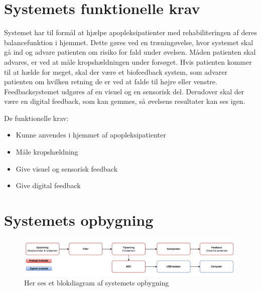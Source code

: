 \section{Systemets funktionelle krav}

Systemet har til formål at hjælpe apopleksipatienter med rehabiliteringen af deres balancefunktion i hjemmet. Dette gøres ved en træningøvelse, hvor systemet skal gå ind og advare patienten om risiko for fald under øvelsen. Måden patienten skal advares, er ved at måle kropshældningen under forsøget. Hvis patienten kommer til at hælde for meget, skal der være et biofeedback system, som advarer patienten om hvilken retning de er ved at falde til højre eller venstre. Feedbacksystemet udgøres af en visuel og en sensorisk del. %
Derudover skal der være en digital feedback, som kan gemmes, så øvelsens resultater kan ses igen. 

De funktionelle krav:
\begin{itemize}
\item Kunne anvendes i hjemmet af apopleksipatienter
\item Måle kropshældning
\item Give visuel og sensorisk feedback
\item Give digital feedback
\end{itemize}

\section{Systemets opbygning}
\begin{figure}[H]
\centering
\includegraphics[scale=0.5]{figures/Blokdiagram.jpg}
\caption{Her ses et blokdiagram af systemets opbygning}
\label{Blokdiagram}
\end{figure}